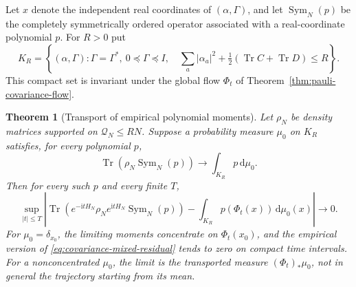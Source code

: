 \documentclass[11pt,a4paper,oneside]{book}
\theoremstyle{plain}
\newtheorem{theorem}{Theorem}[chapter]
\theoremstyle{definition}
\theoremstyle{remark}
\newcommand{\dd}{\mathrm d}
\newcommand{\ii}{\mathrm i}
\newcommand{\Tr}{\operatorname{Tr}}
\begin{document}
Let $x$ denote the independent real coordinates of $(\alpha,\Gamma)$,
and let $\operatorname{Sym}_N(p)$ be the completely symmetrically
ordered operator associated with a real-coordinate polynomial $p$.
For $R>0$ put
\begin{equation}
 K_R=\left\{(\alpha,\Gamma):\Gamma=\Gamma^*,\ 0\preceq\Gamma\preceq I,
 \quad\sum_a|\alpha_a|^2+\tfrac12(\Tr C+\Tr D)\le R\right\}.
 \label{eq:many-copy-compact-state-space}
\end{equation}
This compact set is invariant under the global flow $\Phi_t$ of
Theorem~\ref{thm:pauli-covariance-flow}.

\begin{theorem}[Transport of empirical polynomial moments]
\label{thm:many-copy-transport}
Let $\rho_N$ be density matrices supported on
$\mathcal Q_N\le RN$.  Suppose a probability measure $\mu_0$ on $K_R$
satisfies, for every polynomial $p$,
\begin{equation}
 \Tr(\rho_N\operatorname{Sym}_N(p))\longrightarrow\int_{K_R}p\,\dd\mu_0.
 \label{eq:many-copy-initial-moments}
\end{equation}
Then for every such $p$ and every finite $T$,
\begin{equation}
 \sup_{|t|\le T}\left|
 \Tr(e^{-\ii tH_N}\rho_Ne^{\ii tH_N}\operatorname{Sym}_N(p))
       -\int_{K_R}p(\Phi_t(x))\,\dd\mu_0(x)\right|\longrightarrow0.
 \label{eq:many-copy-moment-transport}
\end{equation}
For $\mu_0=\delta_{x_0}$, the limiting moments concentrate on
$\Phi_t(x_0)$, and the empirical version of
\eqref{eq:covariance-mixed-residual} tends to zero on compact time
intervals.  For a nonconcentrated $\mu_0$, the limit is the transported
measure $(\Phi_t)_*\mu_0$, not in general the trajectory starting from
its mean.
\end{theorem}
\end{document}
